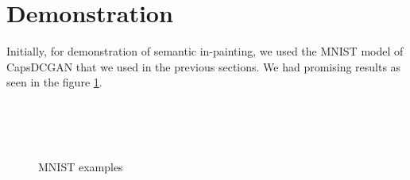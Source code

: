 
\section{Demonstration} %
\label{sec:demonstration}

Initially, for demonstration of semantic in-painting, we used the MNIST model of CapsDCGAN that we used in the previous sections. We had promising results as seen in the figure \ref{fig:mnist_examples}.

\begin{figure}[H]
    \centering
    \\
    \centering
    \\
    \centering
    \\
    \centering
    \caption{MNIST examples}%
    \label{fig:mnist_examples}%
\end{figure}
